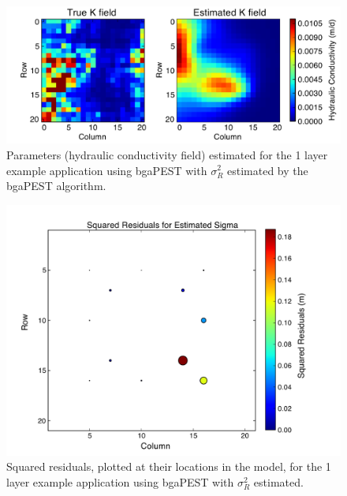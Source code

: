 \documentclass[11pt,oneside,onecolumn]{usgsreport}
\begin{document}
\begin{appendix}
\begin{figure}[!t]
\begin{center} \includegraphics[scale=0.7]{figures/1_lay_best_pars_sigma_estimated}\end{center}

\caption{\label{fig:KL1-sigEstimated}Parameters (hydraulic conductivity field)
estimated for the 1 layer example application using bgaPEST with $\sigma_{R}^{2}$
estimated by the bgaPEST algorithm.}
\end{figure}


\begin{figure}[!t]
\begin{center} \includegraphics[scale=0.4]{figures/1_layer_estimated_sigma_residuals}\end{center}

\caption{\label{fig:residL1-sigEstimated}Squared residuals, plotted at their
locations in the model, for the 1 layer example application using
bgaPEST with $\sigma_{R}^{2}$ estimated.}
\end{figure}



\end{appendix}
\end{document}

